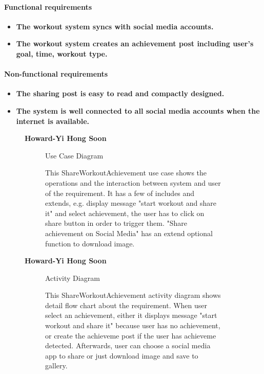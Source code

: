 \documentclass{article}
\begin{document}
		\paragraph{Functional requirements}

		\begin{itemize}
			\item \textbf{The workout system syncs with social media accounts.}
			\item \textbf{The workout system creates an achievement post including user's goal, time, workout type.}
		\end{itemize}
		
		\paragraph{Non-functional requirements}
		
		\begin{itemize}
			\item \textbf{The sharing post is easy to read and compactly designed.}
			\item \textbf{The system is well connected to all social media accounts when the internet is available.}
		\end{itemize}
		
	

	\begin{figure}[htbp]
		\textbf{Howard-Yi Hong Soon}
		\centering
		\begin{subfigure}{\textwidth}
			\resizebox{\textwidth}{!}{}
			\caption{Use Case Diagram}
		\end{subfigure}
		\begin{subfigure}{\textwidth}
			This ShareWorkoutAchievement use case shows the operations and the interaction between system and user
			of the requirement. It has a few of includes and extends, e.g. display message "start workout and share it" and
			select achievement, the user has to click on share button in order to trigger them. "Share achievement on Social Media" has an extend
			optional function to download image. 
		\end{subfigure}
	\end{figure}
	


	\begin{figure}[htbp]
		\textbf{Howard-Yi Hong Soon}
		\centering
		\begin{subfigure}{\textwidth}
			\resizebox{\textwidth}{!}{}
			\caption{Activity Diagram}
		\end{subfigure}
		\begin{subfigure}{\textwidth}
			This ShareWorkoutAchievement activity diagram shows detail flow chart about the requirement. 
			When user select an achievement, either it displays message "start workout and share it" because user has no 
			achievement, or create the achieveme post if the user has achieveme detected. Afterwards, user can choose a 
			social media app to share or just download image and save to gallery.
		\end{subfigure}
	\end{figure}
	
\end{document}
